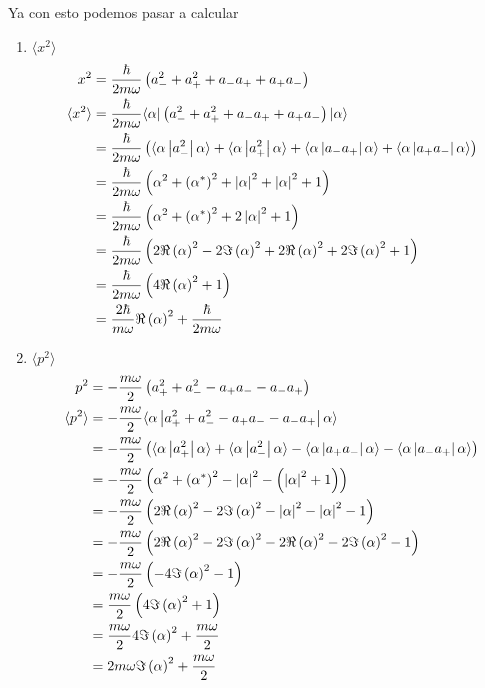 \documentclass{report}
\newcommand{\rlangle}[1]{\langle\alpha\left|#1\right|\alpha\rangle}
\begin{document}
Ya con esto podemos pasar a calcular
\begin{enumerate}
  \item $\langle x^2 \rangle$
    \begin{align*}
      x^2 &= \frac{\hbar}{2m\omega} \paren{a_{-}^2 + a_{+}^2 + a_- a_+ + a_+a_-}\\
      \langle x^2 \rangle &= \frac{\hbar}{2m\omega} \langle \alpha |\paren{a_{-}^2 + a_{+}^2 + a_- a_+ + a_+a_-}| \alpha \rangle\\
      &= \frac{\hbar}{2m\omega} \paren{\rlangle{a_{-}^2} + \rlangle{a_{+}^2} + \rlangle{a_- a_+} + \rlangle{a_+a_-}}\\
      &= \frac{\hbar}{2m\omega} \paren{\alpha^2 + \paren{\alpha^*}^2 + \left|\alpha\right|^2 + \left|\alpha\right|^2 + 1}\\
      &= \frac{\hbar}{2m\omega} \paren{\alpha^2 + \paren{\alpha^*}^2 + 2\left|\alpha\right|^2+ 1}\\
      &= \frac{\hbar}{2m\omega} \paren{2\Re \paren{\alpha}^2 - 2\Im \paren{\alpha}^2 + 2\Re\paren{\alpha}^2 + 2\Im\paren{\alpha}^2 + 1}\\
      &= \frac{\hbar}{2m\omega} \paren{4\Re \paren{\alpha}^2 + 1}\\
      &= \frac{2\hbar}{m\omega}\Re \paren{\alpha}^2 + \frac{\hbar}{2m\omega}
    \end{align*}

  \item $\langle p^2 \rangle$
    \begin{align*}
      p^2 &= - \frac{m\omega}{2}\paren{a_{+}^2 + a_{-}^2 - a_+a_- - a_-a_+}\\
      \langle p^2 \rangle &= - \frac{m\omega}{2}\rlangle{a_{+}^2 + a_{-}^2 - a_+a_- - a_-a_+}\\
      &= - \frac{m\omega}{2}\paren{\rlangle{a_{+}^2} + \rlangle{a_{-}^2} - \rlangle{a_+a_-} - \rlangle{a_-a_+}}\\
      &= - \frac{m\omega}{2}\paren{\alpha^2 + \paren{\alpha^*}^2 - \left|\alpha\right|^2 - \paren{\left|\alpha\right|^2 + 1}}\\
      &= - \frac{m\omega}{2}\paren{2\Re\paren{\alpha}^2 - 2\Im\paren{\alpha}^2 - \left|\alpha\right|^2 - \left|\alpha\right|^2 - 1}\\
      &= - \frac{m\omega}{2}\paren{2\Re\paren{\alpha}^2 - 2\Im\paren{\alpha}^2 - 2\Re\paren{\alpha}^2 - 2\Im\paren{\alpha}^2 - 1}\\
      &= - \frac{m\omega}{2}\paren{- 4\Im\paren{\alpha}^2 - 1}\\
      &= \frac{m\omega}{2}\paren{4\Im\paren{\alpha}^2 + 1}\\
      &= \frac{m\omega}{2}4\Im\paren{\alpha}^2 + \frac{m\omega}{2}\\
      &= 2m\omega\Im\paren{\alpha}^2 + \frac{m\omega}{2}
    \end{align*}
\end{enumerate}
\end{document}
